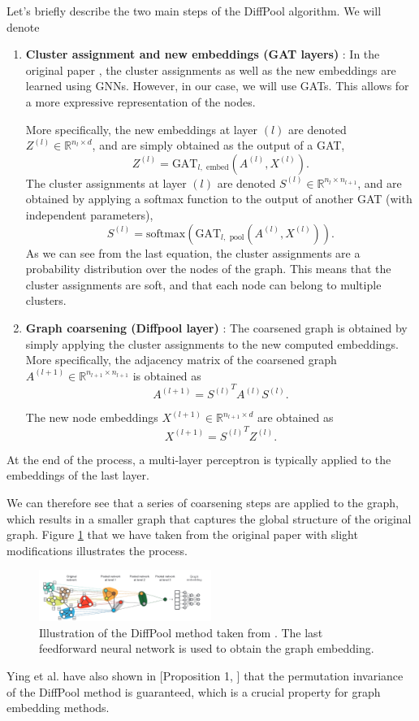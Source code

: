 \documentclass[switch, 12pt]{article}
\newcommand{\R}{\mathbb{R}}
\begin{document}
\begin{multicols}{2}
    Let's briefly describe the two main steps of the DiffPool algorithm. We will denote
    \begin{enumerate}
        \item \textbf{Cluster assignment and new embeddings (GAT layers)} : In the original paper \cite{ying-2018}, the cluster assignments as well as the new embeddings are learned using GNNs. However, in our case, we will use GATs. This allows for a more expressive representation of the nodes.

              More specifically, the new embeddings at layer $(l)$ are denoted $Z^{(l)}\in\R^{n_l\times d}$, and are simply obtained as the output of a GAT,
              $$Z^{(l)} = \text{GAT}_{l, \text{ embed}}\left(A^{(l)},X^{(l)}\right).$$
              \noindent The cluster assignments at layer $(l)$ are denoted $S^{(l)}\in\R^{n_l\times n_{l+1}}$, and are obtained by applying a softmax function to the output of another GAT (with independent parameters),
              $$S^{(l)} = \text{softmax}\left(\text{GAT}_{l, \text{ pool}}\left(A^{(l)},X^{(l)}\right)\right).$$
              \noindent As we can see from the last equation, the cluster assignments are a probability distribution over the nodes of the graph. This means that the cluster assignments are soft, and that each node can belong to multiple clusters.
        \item \textbf{Graph coarsening (Diffpool layer)} : The coarsened graph is obtained by simply applying the cluster assignments to the new computed embeddings. More specifically, the adjacency matrix of the coarsened graph $A^{(l+1)} \in \R^{n_{l+1}\times n_{l+1}}$ is obtained as
              $$A^{(l+1)} = {S^{(l)}}^TA^{(l)}S^{(l)}.$$

              The new node embeddings $X^{(l+1)}\in\R^{n_{l+1}\times d}$ are obtained as
              $$X^{(l+1)} = {S^{(l)}}^T Z^{(l)}.$$
    \end{enumerate}
    At the end of the process, a multi-layer perceptron is typically applied to the embeddings of the last layer.

    We can therefore see that a series of coarsening steps are applied to the graph, which results in a smaller graph that captures the global structure of the original graph. Figure \ref{fig:diffpool} that we have taken from the original paper \cite{ying-2018} with slight modifications illustrates the process.

    \begin{figure}[H]
        \centering
        \includegraphics[width=0.5\textwidth]{figures/diffpool.jpg}
        \caption{Illustration of the DiffPool method taken from \cite{ying-2018}. The last feedforward neural network is used to obtain the graph embedding.}
        \label{fig:diffpool}
    \end{figure}
    Ying et al. have also shown in [Proposition 1, \cite{ying-2018}] that the permutation invariance of the DiffPool method is guaranteed, which is a crucial property for graph embedding methods.

\end{multicols}
\end{document}
